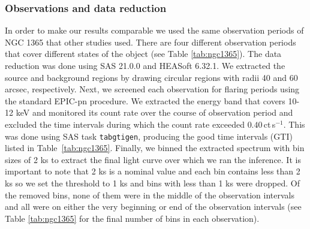 \documentclass{aa}
\begin{document}
\subsubsection{Observations and data reduction}
\label{sec:data_reduction}
In order to make our results comparable we used the same observation periods of NGC 1365 that other studies used. There are four different observation periods that cover different states of the object (see Table \ref{tab:ngc1365}). The data reduction was done using SAS 21.0.0 and HEASoft 6.32.1. We extracted the source and background regions by drawing circular regions with radii 40 and 60 arcsec, respectively. Next, we screened each observation for flaring periods using the standard EPIC-pn procedure. We extracted the energy band that covers 10-12 keV and monitored its count rate over the course of observation period and excluded the time intervals during which the count rate exceeded $0.40$\,ct\,s$^{-1}$. This was done using SAS task \texttt{tabgtigen}, producing the good time intervals (GTI) listed in Table~\ref{tab:ngc1365}. Finally, we binned the extracted spectrum with bin sizes of 2 ks to extract the final light curve over which we ran the inference. It is important to note that 2 ks is a nominal value and each bin contains less than 2 ks so we set the threshold to 1 ks and bins with less than 1 ks were dropped. Of the removed bins, none of them were in the middle of the observation intervals and all were on either the very beginning or end of the observation intervals (see Table \ref{tab:ngc1365} for the final number of bins in each observation). \\
\end{document}
